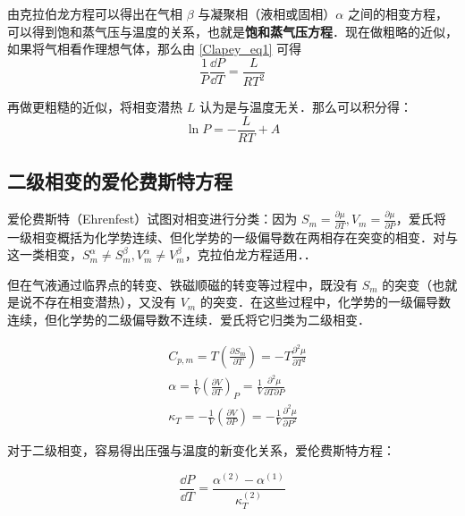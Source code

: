 由克拉伯龙方程可以得出在气相 $\beta$ 与凝聚相（液相或固相）$\alpha$ 之间的相变方程，可以得到饱和蒸气压与温度的关系，也就是\textbf{饱和蒸气压方程}．现在做粗略的近似，如果将气相看作理想气体，那么由 \autoref{Clapey_eq1} 可得
\begin{equation}
\frac{1}{P}\frac{\dd P}{\dd T}=\frac{L}{RT^2}
\end{equation}

再做更粗糙的近似，将相变潜热 $L$ 认为是与温度无关．那么可以积分得：
\begin{equation}
\ln P=-\frac{L}{RT}+A
\end{equation}

\subsection{二级相变的爱伦费斯特方程}

爱伦费斯特（Ehrenfest）试图对相变进行分类：因为 $S_m=\frac{\partial \mu}{\partial T},V_m=\frac{\partial \mu}{\partial P}$，爱氏将一级相变概括为化学势连续、但化学势的一级偏导数在两相存在突变的相变．对与这一类相变，$S_m^\alpha\neq S_m^\beta,V_m^\alpha\neq V_m^\beta$，克拉伯龙方程适用．．

但在气液通过临界点的转变、铁磁顺磁的转变等过程中，既没有 $S_m$ 的突变（也就是说不存在相变潜热），又没有 $V_m$ 的突变．在这些过程中，化学势的一级偏导数连续，但化学势的二级偏导数不连续．爱氏将它归类为二级相变．

\begin{align}
&C_{p,m}=T\left(\frac{\partial S_m}{\partial T}\right)=-T\frac{\partial^2 \mu}{\partial T^2}\\
&\alpha=\frac{1}{V}\left(\frac{\partial V}{\partial T}\right)_P
=\frac{1}{V}\frac{\partial^2\mu}{\partial T\partial P}\\
&\kappa_T=-\frac{1}{V}\left(\frac{\partial V}{\partial P}\right)
=-\frac{1}{V}\frac{\partial^2\mu}{\partial P^2}
\end{align}

对于二级相变，容易得出压强与温度的新变化关系，爱伦费斯特方程：

\begin{equation}
\frac{\dd P}{\dd T}=\frac{\alpha^{(2)}-\alpha^{(1)}}{\kappa_T^{(2)}}
\end{equation}